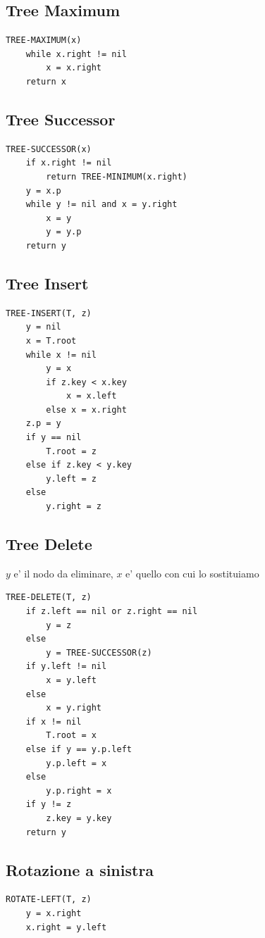 \documentclass[10pt,a4paper]{article}
\begin{document}
\begin{multicols*}{2}
\subsection*{Tree Maximum}
\begin{lstlisting}
TREE-MAXIMUM(x)
    while x.right != nil
        x = x.right
    return x
\end{lstlisting}
\subsection*{Tree Successor}
\begin{lstlisting}
TREE-SUCCESSOR(x)
    if x.right != nil
        return TREE-MINIMUM(x.right)
    y = x.p
    while y != nil and x = y.right
        x = y
        y = y.p
    return y
\end{lstlisting}
\subsection*{Tree Insert}
\begin{lstlisting}
TREE-INSERT(T, z)
    y = nil
    x = T.root
    while x != nil
        y = x
        if z.key < x.key
            x = x.left
        else x = x.right
    z.p = y
    if y == nil
        T.root = z
    else if z.key < y.key
        y.left = z
    else
        y.right = z
\end{lstlisting}

\subsection*{Tree Delete}
$y$ e' il nodo da eliminare, $x$ e' quello con cui lo sostituiamo
\begin{lstlisting}
TREE-DELETE(T, z)
    if z.left == nil or z.right == nil
        y = z
    else
        y = TREE-SUCCESSOR(z)
    if y.left != nil
        x = y.left
    else
        x = y.right
    if x != nil
        T.root = x
    else if y == y.p.left
        y.p.left = x
    else
        y.p.right = x
    if y != z
        z.key = y.key
    return y
\end{lstlisting}

\vfill\mbox{}
\columnbreak

\subsection*{Rotazione a sinistra}
\begin{lstlisting}
ROTATE-LEFT(T, z)
    y = x.right
    x.right = y.left


\end{lstlisting}
\end{multicols*}
\end{document}
